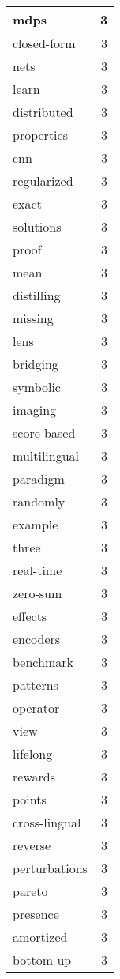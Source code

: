 \begin{table}[h]
\begin{tabular}{|l|r|}
\hline
mdps & 3 \\
\hline
closed-form & 3 \\
\hline
nets & 3 \\
\hline
learn & 3 \\
\hline
distributed & 3 \\
\hline
properties & 3 \\
\hline
cnn & 3 \\
\hline
regularized & 3 \\
\hline
exact & 3 \\
\hline
solutions & 3 \\
\hline
proof & 3 \\
\hline
mean & 3 \\
\hline
distilling & 3 \\
\hline
missing & 3 \\
\hline
lens & 3 \\
\hline
bridging & 3 \\
\hline
symbolic & 3 \\
\hline
imaging & 3 \\
\hline
score-based & 3 \\
\hline
multilingual & 3 \\
\hline
paradigm & 3 \\
\hline
randomly & 3 \\
\hline
example & 3 \\
\hline
three & 3 \\
\hline
real-time & 3 \\
\hline
zero-sum & 3 \\
\hline
effects & 3 \\
\hline
encoders & 3 \\
\hline
benchmark & 3 \\
\hline
patterns & 3 \\
\hline
operator & 3 \\
\hline
view & 3 \\
\hline
lifelong & 3 \\
\hline
rewards & 3 \\
\hline
points & 3 \\
\hline
cross-lingual & 3 \\
\hline
reverse & 3 \\
\hline
perturbations & 3 \\
\hline
pareto & 3 \\
\hline
presence & 3 \\
\hline
amortized & 3 \\
\hline
bottom-up & 3 \\

\end{tabular}
\end{table}
